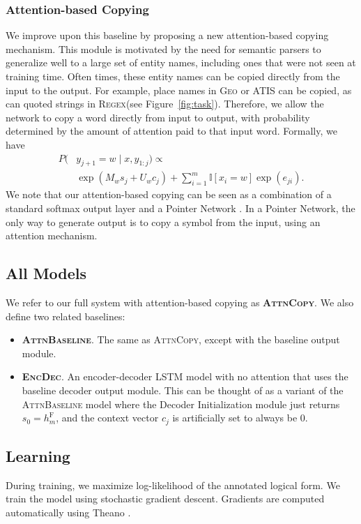 \documentclass[11pt,letterpaper]{article}
\newcommand{\encdec}{\textsc{EncDec}\xspace}
\newcommand{\attn}{\textsc{AttnBaseline}\xspace}
\newcommand{\attncopy}{\textsc{AttnCopy}\xspace}
\newcommand{\atis}{\textsc{ATIS}\xspace}
\newcommand{\regex}{\textsc{Regex}\xspace}
\newcommand{\geo}{\textsc{Geo}\xspace}
\newcommand\rj[1]{}
\begin{document}
\subsubsection{Attention-based Copying}
We improve upon this baseline by proposing a new 
attention-based copying mechanism.
This module is motivated by the need for semantic parsers
to generalize well to a large set of entity names,
including ones that were not seen at training time.
Often times, these entity names
can be copied directly from the input to the output.
For example, place names in \geo or \atis can be copied,
as can quoted strings in \regex (see Figure~\ref{fig:task}).
Therefore, we allow the network to copy a word directly from input to output,
with probability determined by the amount of attention paid to that input word.
Formally, we have
\begin{align}
  P(&y_{j+1} = w \mid x, y_{1:j}) \propto 
  \\ & \exp(M_{w} s_j + U_w c_j)
  + \sum_{i=1}^m \mathbb{I}[x_i = w] \exp(e_{ji}).
\end{align}
We note that our attention-based copying can be seen as a 
combination of a standard softmax output layer
and a Pointer Network \cite{vinyals2015pointer}.  In a Pointer Network,
the only way to generate output is to copy a symbol from the input,
using an attention mechanism.

\subsection{All Models}
We refer to our full system with attention-based copying as \textbf{\attncopy}.
We also define two related baselines:
\begin{itemize}
  \item \textbf{\attn}.  The same as \attncopy, except with the baseline 
    output module.
  \item \textbf{\encdec}.  An encoder-decoder LSTM model with no attention
    that uses the baseline decoder output module.  
    This can be thought of as a variant of the \attn model
    where the Decoder Initialization module
    just returns $s_0 = h_m^{\text{F}}$,
    and the context vector $c_j$ is artificially set to always be $0$.
    \rj{I need to make sure this is true}
\end{itemize}

\subsection{Learning}
During training, we maximize log-likelihood of the annotated logical form.
We train the model using stochastic gradient descent.
Gradients are computed automatically using Theano \cite{bergstra2010theano}.
\end{document}
